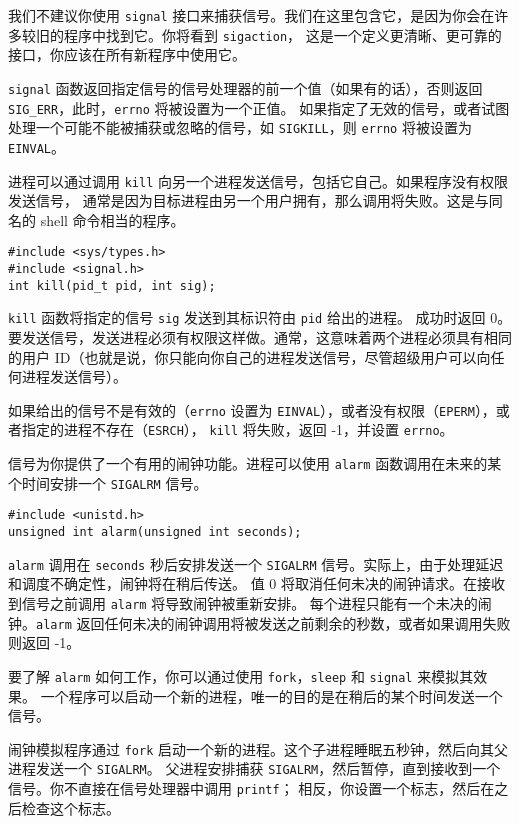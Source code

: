 \documentclass{ctexart}
\begin{document}
我们不建议你使用 \texttt{signal} 接口来捕获信号。我们在这里包含它，是因为你会在许多较旧的程序中找到它。你将看到 \texttt{sigaction}，
这是一个定义更清晰、更可靠的接口，你应该在所有新程序中使用它。  
  
\texttt{signal} 函数返回指定信号的信号处理器的前一个值（如果有的话），否则返回 \texttt{SIG\_ERR}，此时，\texttt{errno} 将被设置为一个正值。
如果指定了无效的信号，或者试图处理一个可能不能被捕获或忽略的信号，如 \texttt{SIGKILL}，则 \texttt{errno} 将被设置为 \texttt{EINVAL}。  

进程可以通过调用 \texttt{kill} 向另一个进程发送信号，包括它自己。如果程序没有权限发送信号，
通常是因为目标进程由另一个用户拥有，那么调用将失败。这是与同名的 shell 命令相当的程序。  
  
\begin{verbatim}  
#include <sys/types.h>  
#include <signal.h>  
int kill(pid_t pid, int sig);  
\end{verbatim}  
  
\texttt{kill} 函数将指定的信号 \texttt{sig} 发送到其标识符由 \texttt{pid} 给出的进程。
成功时返回 0。要发送信号，发送进程必须有权限这样做。通常，这意味着两个进程必须具有相同的用户 ID（也就是说，你只能向你自己的进程发送信号，尽管超级用户可以向任何进程发送信号）。  
  
如果给出的信号不是有效的（\texttt{errno} 设置为 \texttt{EINVAL}），或者没有权限（\texttt{EPERM}），或者指定的进程不存在（\texttt{ESRCH}），
\texttt{kill} 将失败，返回 -1，并设置 \texttt{errno}。  
  
信号为你提供了一个有用的闹钟功能。进程可以使用 \texttt{alarm} 函数调用在未来的某个时间安排一个 \texttt{SIGALRM} 信号。  
  
\begin{verbatim}  
#include <unistd.h>  
unsigned int alarm(unsigned int seconds);  
\end{verbatim}  
  
\texttt{alarm} 调用在 \texttt{seconds} 秒后安排发送一个 \texttt{SIGALRM} 信号。实际上，由于处理延迟和调度不确定性，闹钟将在稍后传送。
值 0 将取消任何未决的闹钟请求。在接收到信号之前调用 \texttt{alarm} 将导致闹钟被重新安排。
每个进程只能有一个未决的闹钟。\texttt{alarm} 返回任何未决的闹钟调用将被发送之前剩余的秒数，或者如果调用失败则返回 -1。  
  
要了解 \texttt{alarm} 如何工作，你可以通过使用 \texttt{fork}，\texttt{sleep} 和 \texttt{signal} 来模拟其效果。
一个程序可以启动一个新的进程，唯一的目的是在稍后的某个时间发送一个信号。  

闹钟模拟程序通过 \texttt{fork} 启动一个新的进程。这个子进程睡眠五秒钟，然后向其父进程发送一个 \texttt{SIGALRM}。
父进程安排捕获 \texttt{SIGALRM}，然后暂停，直到接收到一个信号。你不直接在信号处理器中调用 \texttt{printf}；
相反，你设置一个标志，然后在之后检查这个标志。  
  
\end{document}
